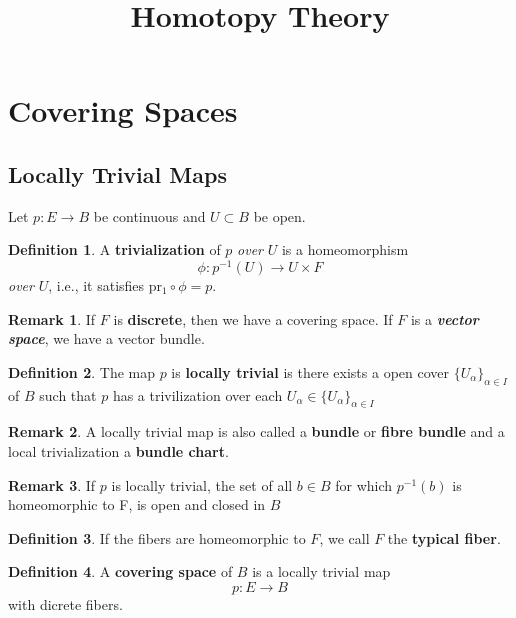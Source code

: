 \documentclass{article}
\title{Homotopy Theory}
\author{}
\date{}
\theoremstyle{definition}
\newtheorem{remark}{Remark}
\newtheorem{defn}{Definition}[section]
\begin{document}
\Large
\maketitle
\tableofcontents
\newpage
\section{Covering Spaces}
\subsection{Locally Trivial Maps}
 Let $p:E \rightarrow B$ be continuous and $U\subset B$ be open.
\begin{defn} A \textbf{trivialization} of $p$ \textit{over} $U$ is a homeomorphism $$\phi:p^{-1}(U)\rightarrow U \times F$$ \textit{over} $U$, i.e.,  it satisfies pr$_1 \circ \phi = p$.
\end{defn}
\begin{remark}
If $F$ is \textbf{discrete}, then we have a covering space. If $F$ is a \textbf{\textit{vector space}}, we have a vector bundle.
\end{remark}
\begin{defn} The map $p$ is \textbf{locally trivial} is there exists a open cover $\{U_{\alpha}\}_{\alpha\in I}$ of $B$ such that $p$ has a trivilization over each $U_\alpha\in \{ U_{\alpha}\}_{\alpha\in I}$\end{defn}
\begin{remark}
A locally trivial map is also called a \textbf{bundle} or \textbf{fibre bundle} and a local trivialization a \textbf{bundle chart}. 
\end{remark}
\begin{remark}
If $p$ is locally trivial, the set of all $b\in B$ for which $p^{-1}(b)$ is homeomorphic to  F, is open and closed in $B$
\end{remark}
\begin{defn}
If the fibers are homeomorphic to $F$, we call $F$ the \textbf{typical fiber}.
\end{defn}
\begin{defn}
A \textbf{covering space} of $B$ is a locally trivial map $$p:E \rightarrow B$$ with dicrete fibers.
\end{defn}
\end{document}
